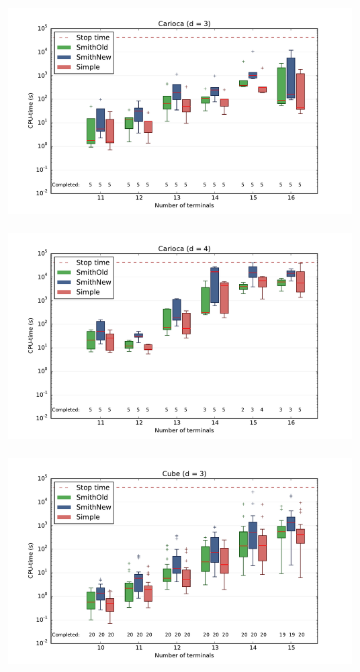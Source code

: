 \begin{figure}[htbp]
  \centering
  \begin{subfigure}[t]{0.5\textwidth}
    \includegraphics[width=\textwidth]{gfx/boxplots/plot_nvst_boxplot_d3_Carioca_1}
  \end{subfigure}%
  \begin{subfigure}[t]{0.5\textwidth}
    \includegraphics[width=\textwidth]{gfx/boxplots/plot_nvst_boxplot_d4_Carioca_1}
  \end{subfigure}
  \begin{subfigure}[t]{0.5\textwidth}
    \includegraphics[width=\textwidth]{gfx/boxplots/plot_nvst_boxplot_d3_Cube_1}

\end{subfigure}
\end{figure}
